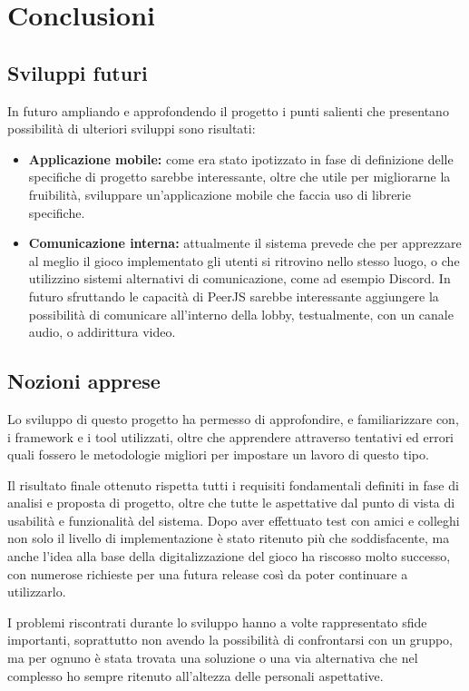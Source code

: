 \section{Conclusioni}

\subsection{Sviluppi futuri}
In futuro ampliando e approfondendo il progetto i punti salienti che presentano possibilità di ulteriori sviluppi sono risultati:

\begin{itemize}
    \item \textbf{Applicazione mobile:} come era stato ipotizzato in fase di definizione delle specifiche di progetto sarebbe interessante, oltre che utile per migliorarne la fruibilità, sviluppare un'applicazione mobile che faccia uso di librerie specifiche.
    \item \textbf{Comunicazione interna:} attualmente il sistema prevede che per apprezzare al meglio il gioco implementato gli utenti si ritrovino nello stesso luogo, o che utilizzino sistemi alternativi di comunicazione, come ad esempio Discord. In futuro sfruttando le capacità di PeerJS sarebbe interessante aggiungere la possibilità di comunicare all'interno della lobby, testualmente, con un canale audio, o addirittura video.
\end{itemize}
\subsection{Nozioni apprese}

Lo sviluppo di questo progetto ha permesso di approfondire, e familiarizzare con, i framework e i tool utilizzati, oltre che apprendere attraverso tentativi ed errori quali fossero le metodologie migliori per impostare un lavoro di questo tipo.

Il risultato finale ottenuto rispetta tutti i requisiti fondamentali definiti in fase di analisi e proposta di progetto, oltre che tutte le aspettative dal punto di vista di usabilità e funzionalità del sistema. Dopo aver effettuato test con amici e colleghi non solo il livello di implementazione è stato ritenuto più che soddisfacente, ma anche l'idea alla base della digitalizzazione del gioco ha riscosso molto successo, con numerose richieste per una futura release così da poter continuare a utilizzarlo.

I problemi riscontrati durante lo sviluppo hanno a volte rappresentato sfide importanti, soprattutto non avendo la possibilità di confrontarsi con un gruppo, ma per ognuno è stata trovata una soluzione o una via alternativa che nel complesso ho sempre ritenuto all'altezza delle personali aspettative.
